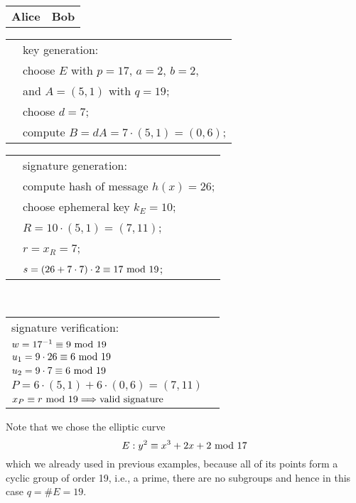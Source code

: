 \begin{center}
\begin{framed}
    \begin{tabular}{c@{\hskip 10cm}c}
        \textbf{Alice}&\textbf{Bob}
    \end{tabular}
    \begin{tabular}{l@{\hskip 11cm}l}
        &key generation:\\
        &choose $E$ with $p=17$, $a=2$, $b=2$,\\
        &and $A=(5,1)$ with $q=19$;\\
        &choose $d=7$;\\
        &compute $B=dA=7\cdot(5,1)=(0,6)$;
    \end{tabular}
    \begin{tabular}{l@{\hskip 11cm}l}
        &signature generation:\\
        &compute hash of message $h(x)=26$;\\
        &choose ephemeral key $k_E=10$;\\
        &$R=10\cdot(5,1)=(7,11)$;\\
        &$r=x_R=7$;\\
        &$s=(26+7\cdot7)\cdot2\equiv17\text{ mod }19$;
    \end{tabular}
    \\
    \begin{tabular}{l@{\hskip 11cm}l}
        signature verification:&\\
        $w=17^{-1}\equiv9\text{ mod }19$&\\
        $u_1=9\cdot26\equiv6\text{ mod }19$&\\
        $u_2=9\cdot7\equiv6\text{ mod }19$&\\
        $P=6\cdot(5,1)+6\cdot(0,6)=(7,11)$&\\
        $x_P\equiv r\text{ mod }19\Longrightarrow\text{valid signature}$&
    \end{tabular}
\end{framed}
\end{center}
Note that we chose the elliptic curve
$$E:y^2\equiv x^3+2x+2\text{ mod }17$$
which we already used in previous examples, because all of its points form a cyclic group of order 19, i.e., a prime, there are no subgroups and hence in this case $q=\#E=19$.

